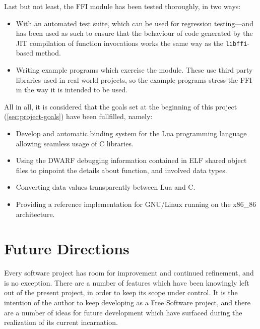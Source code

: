 Last but not least, the \Eol* FFI module has been tested thoroughly, in two
ways:

\begin{itemize}

	\item With an automated test suite, which can be used for regression
	testing—and has been used as such to ensure that the behaviour of code
	generated by the JIT compilation of function invocations works the same
	way as the \verb|libffi|-based method.

	\item Writing example programs which exercise the module. These use third
	party libraries used in real world projects, so the example programs
	stress the FFI in the way it is intended to be used.

\end{itemize}

All in all, it is considered that the goals set at the beginning of this
project (\autoref{sec:project-goals}) have been fullfilled, namely:

\begin{itemize}

	\item Develop and automatic binding system for the Lua programming
	language allowing seamless usage of C libraries.

	\item Using the DWARF debugging information contained in ELF shared object
	files to pinpoint the details about function, and involved data types.

	\item Converting data values transparently between Lua and C.

	\item Providing a reference implementation for GNU/Linux running on the
	x86\_86 architecture.

\end{itemize}


\section{Future Directions}

Every software project has room for improvement and continued refinement, and
\Eol* is no exception. There are a number of features which have been
knowingly left out of the present project, in order to keep its scope under
control. It is the intention of the author to keep developing \Eol* as a Free
Software project, and there are a number of ideas for future development which
have surfaced during the realization of its current incarnation.

